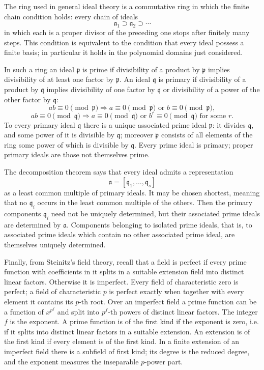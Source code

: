 \documentclass[12pt]{article}
\begin{document}
The ring used in general ideal theory is a commutative ring in which the finite chain condition holds: every chain of ideals
\[
  \mathfrak a_1\supset \mathfrak a_2\supset\cdots
\]
in which each is a proper divisor of the preceding one stops after finitely many steps. This condition is equivalent to the condition that every ideal possess a finite basis; in particular it holds in the polynomial domains just considered.

In such a ring an ideal $\mathfrak p$ is prime if divisibility of a product by $\mathfrak p$ implies divisibility of at least one factor by $\mathfrak p$. An ideal $\mathfrak q$ is primary if divisibility of a product by $\mathfrak q$ implies divisibility of one factor by $\mathfrak q$ or divisibility of a power of the other factor by $\mathfrak q$:
\[
  ab\equiv0\pmod{\mathfrak p}\Rightarrow a\equiv0\pmod{\mathfrak p}\text{ or }b\equiv0\pmod{\mathfrak p},
\]
\[
  ab\equiv0\pmod{\mathfrak q}\Rightarrow a\equiv0\pmod{\mathfrak q}\text{ or }b^r\equiv0\pmod{\mathfrak q}\text{ for some }r.
\]
To every primary ideal $\mathfrak q$ there is a unique associated prime ideal $\mathfrak p$: it divides $\mathfrak q$, and some power of it is divisible by $\mathfrak q$; moreover $\mathfrak p$ consists of all elements of the ring some power of which is divisible by $\mathfrak q$. Every prime ideal is primary; proper primary ideals are those not themselves prime.

The decomposition theorem says that every ideal admits a representation
\[
  \mathfrak a=[\mathfrak q_1,\ldots,\mathfrak q_s]
\]
as a least common multiple of primary ideals. It may be chosen shortest, meaning that no $\mathfrak q_i$ occurs in the least common multiple of the others. Then the primary components $\mathfrak q_i$ need not be uniquely determined, but their associated prime ideals are determined by $\mathfrak a$. Components belonging to isolated prime ideals, that is, to associated prime ideals which contain no other associated prime ideal, are themselves uniquely determined.

Finally, from Steinitz's field theory, recall that a field is perfect if every prime function with coefficients in it splits in a suitable extension field into distinct linear factors. Otherwise it is imperfect. Every field of characteristic zero is perfect; a field of characteristic $p$ is perfect exactly when together with every element it contains its $p$-th root. Over an imperfect field a prime function can be a function of $x^{p^f}$ and split into $p^f$-th powers of distinct linear factors. The integer $f$ is the exponent. A prime function is of the first kind if the exponent is zero, i.e. if it splits into distinct linear factors in a suitable extension. An extension is of the first kind if every element is of the first kind. In a finite extension of an imperfect field there is a subfield of first kind; its degree is the reduced degree, and the exponent measures the inseparable $p$-power part.
\end{document}
